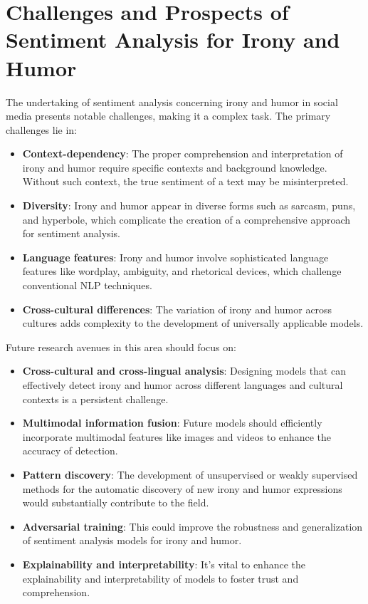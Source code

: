 \documentclass[a4paper]{article}
\begin{document}

\section{Challenges and Prospects of Sentiment Analysis for Irony and Humor}
The undertaking of sentiment analysis concerning irony and humor in social media presents notable challenges, making it a complex task. The primary challenges lie in:

\begin{itemize}
\item \textbf{Context-dependency}: The proper comprehension and interpretation of irony and humor require specific contexts and background knowledge. Without such context, the true sentiment of a text may be misinterpreted.
\item \textbf{Diversity}: Irony and humor appear in diverse forms such as sarcasm, puns, and hyperbole, which complicate the creation of a comprehensive approach for sentiment analysis.
\item \textbf{Language features}: Irony and humor involve sophisticated language features like wordplay, ambiguity, and rhetorical devices, which challenge conventional NLP techniques.
\item \textbf{Cross-cultural differences}: The variation of irony and humor across cultures adds complexity to the development of universally applicable models.
\end{itemize}

Future research avenues in this area should focus on:

\begin{itemize}
\item \textbf{Cross-cultural and cross-lingual analysis}: Designing models that can effectively detect irony and humor across different languages and cultural contexts is a persistent challenge.
\item \textbf{Multimodal information fusion}: Future models should efficiently incorporate multimodal features like images and videos to enhance the accuracy of detection.
\item \textbf{Pattern discovery}: The development of unsupervised or weakly supervised methods for the automatic discovery of new irony and humor expressions would substantially contribute to the field.
\item \textbf{Adversarial training}: This could improve the robustness and generalization of sentiment analysis models for irony and humor.
\item \textbf{Explainability and interpretability}: It's vital to enhance the explainability and interpretability of models to foster trust and comprehension.
\end{itemize}
\end{document}
